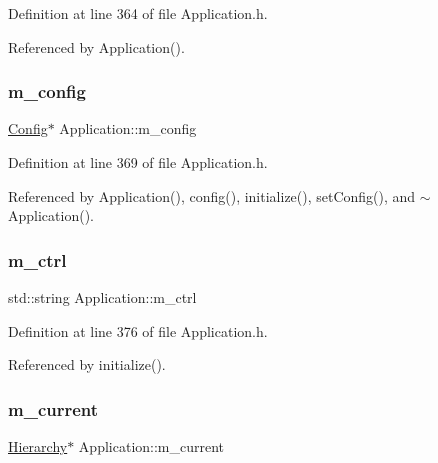 Definition at line 364 of file Application.\+h.



Referenced by Application().

\mbox{\label{classApplication_ae05f3e253ea871a194c3d30fd1d3b0c3}} 
\subsubsection{\texorpdfstring{m\+\_\+config}{m\_config}}
{\footnotesize\ttfamily \hyperlink{classConfig}{Config}$\ast$ Application\+::m\+\_\+config\hspace{0.3cm}{\ttfamily [private]}}



Definition at line 369 of file Application.\+h.



Referenced by Application(), config(), initialize(), set\+Config(), and $\sim$\+Application().

\mbox{\label{classApplication_aa371ed989ed34038df400c4d1b41b37f}} 
\subsubsection{\texorpdfstring{m\+\_\+ctrl}{m\_ctrl}}
{\footnotesize\ttfamily std\+::string Application\+::m\+\_\+ctrl\hspace{0.3cm}{\ttfamily [private]}}



Definition at line 376 of file Application.\+h.



Referenced by initialize().

\mbox{\label{classApplication_ab0fd877a3c66c41b22109863e1719ccd}} 
\subsubsection{\texorpdfstring{m\+\_\+current}{m\_current}}
{\footnotesize\ttfamily \hyperlink{classHierarchy}{Hierarchy}$\ast$ Application\+::m\+\_\+current\hspace{0.3cm}{\ttfamily [protected]}}



